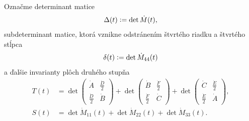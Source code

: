 Označme determinant matice 
$$\Delta(t) \vcentcolon =  \det \dot{M}(t), $$
subdeterminant matice, ktorá vznikne odstránením štvrtého riadku a štvrtého stĺpca 
$$ \delta(t) \vcentcolon = \det \dot{M}_{44}(t) $$
a ďalšie invarianty plôch druhého stupňa
\begin{align*}
T(t) & = \det \left( \begin{matrix}
\dot{A} & \frac{\dot{D}}{2} \\ 
\frac{\dot{D}}{2} & \dot{B}
\end{matrix} \right) + \det \left( \begin{matrix}
\dot{B} & \frac{\dot{F}}{2} \\ 
\frac{\dot{F}}{2} & \dot{C}
\end{matrix} \right) + \det \left(  \begin{matrix}
\dot{C} & \frac{\dot{E}}{2} \\ 
\frac{\dot{E}}{2} & \dot{A}
\end{matrix} \right), \\
S(t) &= \det \dot{M}_{11}(t) + \det \dot{M}_{22}(t) + \det \dot{M}_{33}(t).
\end{align*}

